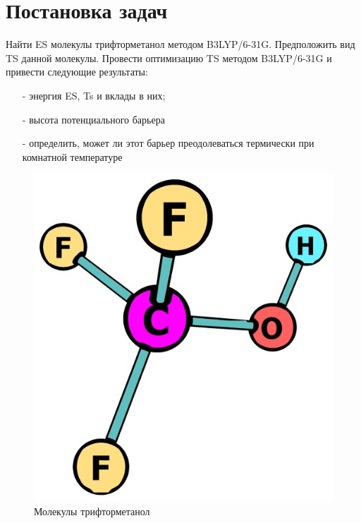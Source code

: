 \section{Постановка задач}
Найти ES молекулы трифторметанол методом B3LYP/6-31G. Предположить вид TS данной молекулы. Провести оптимизацию TS методом B3LYP/6-31G и привести следующие результаты:
\begin{itemize}
    \item[-] энергия ES, Ts и вклады в них;
    \item[-] высота потенциального барьера
    \item[-] определить, может ли этот барьер преодолеваться термически при комнатной температуре
\end{itemize}

\begin{figure}[H]
\centering
\captionsetup{justification=centering}
\includegraphics[scale=0.4]{fig/0.jpg}
\caption{Молекулы трифторметанол}
\end{figure}